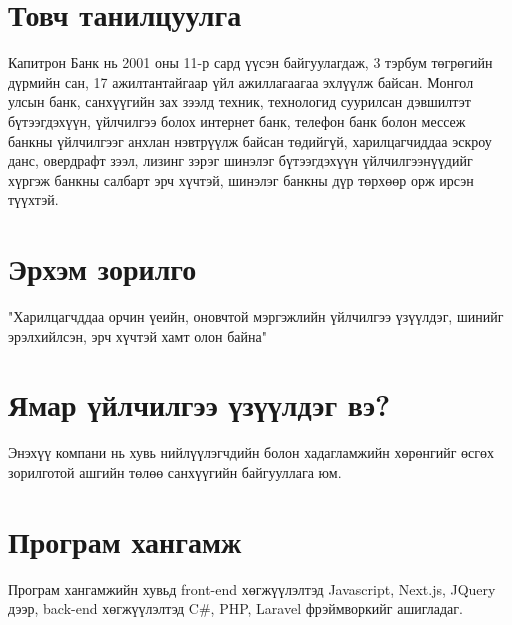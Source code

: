 \section{Товч танилцуулга}
	\quad \quad	Капитрон Банк нь 2001 оны 11-р сард үүсэн байгуулагдаж, 3 тэрбум төгрөгийн дүрмийн сан, 17 ажилтантайгаар үйл ажиллагаагаа эхлүүлж байсан.
    Монгол улсын банк, санхүүгийн зах зээлд техник, технологид суурилсан дэвшилтэт бүтээгдэхүүн, үйлчилгээ болох интернет банк, телефон банк болон мессеж банкны үйлчилгээг анхлан нэвтрүүлж байсан төдийгүй, харилцагчиддаа эскроу данс, овердрафт зээл, лизинг зэрэг шинэлэг бүтээгдэхүүн үйлчилгээнүүдийг хүргэж банкны салбарт эрч хүчтэй, шинэлэг банкны дүр төрхөөр орж ирсэн түүхтэй.

\section{Эрхэм зорилго}
        \quad\quad "Харилцагчддаа орчин үеийн, оновчтой мэргэжлийн үйлчилгээ үзүүлдэг, шинийг эрэлхийлсэн, эрч хүчтэй хамт олон байна"

\section{Ямар үйлчилгээ үзүүлдэг вэ?}
	\quad \quad	Энэхүү компани нь хувь нийлүүлэгчдийн болон хадагламжийн хөрөнгийг өсгөх зорилготой ашгийн төлөө санхүүгийн байгууллага юм.

 \section{Програм хангамж}
        \quad \quad Програм хангамжийн хувьд front-end хөгжүүлэлтэд Javascript, Next.js, JQuery дээр, back-end хөгжүүлэлтэд C#, PHP, Laravel фрэймворкийг ашигладаг. 

